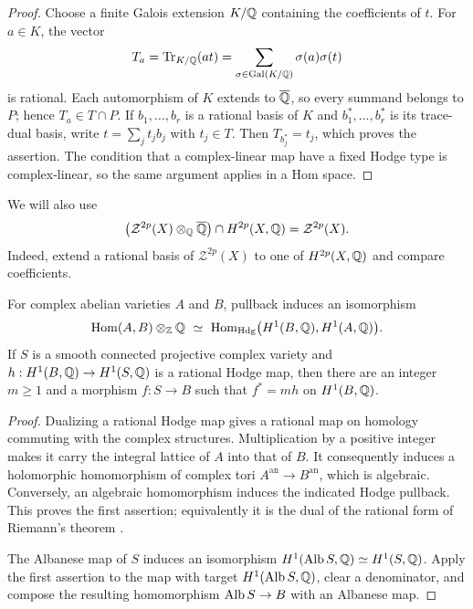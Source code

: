 \begin{proof}
Choose a finite Galois extension \(K/\mathbb{Q}\) containing the coefficients
of \(t\).  For \(a\in K\), the vector
\[
 T_a=\operatorname{Tr}_{K/\mathbb{Q}}(at)
     =\sum_{\sigma\in\operatorname{Gal}(K/\mathbb{Q})}\sigma(a)\sigma(t)
\]
is rational.  Each automorphism of \(K\) extends to \(\overline{\mathbb{Q}}\), so every
summand belongs to \(P\); hence \(T_a\in T\cap P\).  If
\(b_1,\ldots,b_r\) is a rational basis of \(K\) and
\(b_1^*,\ldots,b_r^*\) is its trace-dual basis, write
\(t=\sum_jt_jb_j\) with \(t_j\in T\).  Then \(T_{b_j^*}=t_j\), which
proves the assertion.  The condition that a complex-linear map have a
fixed Hodge type is complex-linear, so the same argument applies in a
Hom space.
\end{proof}

We will also use
\begin{equation}\label{eq:cycle-descent}
 \bigl(\mathcal Z^{2p}(X)\otimes_{\mathbb{Q}}\overline{\mathbb{Q}}\bigr)
       \cap H^{2p}(X,\mathbb{Q})=\mathcal Z^{2p}(X).
\end{equation}
Indeed, extend a rational basis of \(\mathcal Z^{2p}(X)\) to one of
\(H^{2p}(X,\mathbb{Q})\) and compare coefficients.

\begin{lemma}\label{lem:weight-one-maps}
For complex abelian varieties \(A\) and \(B\), pullback induces an
isomorphism
\[
 \operatorname{Hom}(A,B)\otimes_{\mathbb{Z}}\mathbb{Q}
 \ \simeq\
 \operatorname{Hom}_{\mathrm{Hdg}}\bigl(H^1(B,\mathbb{Q}),H^1(A,\mathbb{Q})\bigr).
\]
If \(S\) is a smooth connected projective complex variety and
\(h:H^1(B,\mathbb{Q})\to H^1(S,\mathbb{Q})\) is a rational Hodge map, then there are
an integer \(m\geq1\) and a morphism \(f:S\to B\) such that
\(f^*=mh\) on \(H^1(B,\mathbb{Q})\).
\end{lemma}

\begin{proof}
Dualizing a rational Hodge map gives a rational map on homology
commuting with the complex structures.  Multiplication by a positive
integer makes it carry the integral lattice of \(A\) into that of
\(B\).  It consequently induces a holomorphic homomorphism of complex
tori \(A^{\mathrm{an}}\to B^{\mathrm{an}}\), which is algebraic.
Conversely, an algebraic homomorphism induces the indicated Hodge
pullback.  This proves the first assertion; equivalently it is the
dual of the rational form of Riemann's theorem
\cite[Proposition~6.5, Theorems~6.7--6.8, and Corollary~6.9]{MilneShimura2017}.

The Albanese map of \(S\) induces an isomorphism
\(H^1(\operatorname{Alb} S,\mathbb{Q})\simeq H^1(S,\mathbb{Q})\).  Apply the first assertion to the
map with target \(H^1(\operatorname{Alb} S,\mathbb{Q})\), clear a denominator, and compose
the resulting homomorphism \(\operatorname{Alb} S\to B\) with an Albanese map.
\end{proof}

